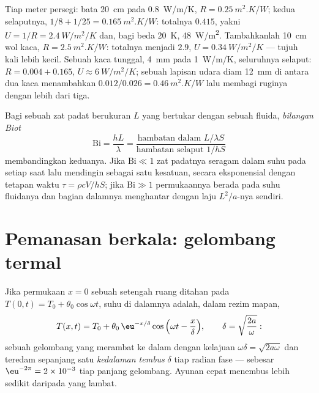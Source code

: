 \begin{example}\label{ex:b2:heat-conduction:wall}
Tiap meter persegi: bata \qty{20}{cm} pada \qty{0.8}{W/m/K}, $R =
\qty{0.25}{m^2.K/W}$; kedua selaputnya, $1/8 + 1/25 = \qty{0.165}{m^2.K/W}$:
totalnya $0.415$, yakni $U = 1/R = \qty{2.4}{W/m^2/K}$ dan, bagi beda \qty{20}{K},
\qty{48}{W/m^2}. Tambahkanlah \qty{10}{cm} wol kaca, $R =
\qty{2.5}{m^2.K/W}$: totalnya menjadi $2.9$, $U = \qty{0.34}{W/m^2/K}$ ---
tujuh kali lebih kecil. Sebuah kaca tunggal, \qty{4}{mm} pada \qty{1}{W/m/K},
seluruhnya selaput: $R = 0.004 + 0.165$, $U \approx \qty{6}{W/m^2/K}$; sebuah
lapisan udara diam \qty{12}{mm} di antara dua kaca menambahkan $0.012/0.026 =
\qty{0.46}{m^2.K/W}$ lalu membagi ruginya dengan lebih dari tiga.
\end{example}

\begin{definition}\label{def:b2:heat-conduction:biot}
Bagi sebuah zat padat berukuran $L$ yang bertukar dengan sebuah fluida, \emph{bilangan
Biot}
\[
\mathrm{Bi} = \frac{hL}{\lambda} = \frac{\text{hambatan dalam } L/\lambda S}{\text{hambatan selaput } 1/hS}
\]
membandingkan keduanya. Jika $\mathrm{Bi} \ll 1$ zat padatnya seragam dalam
suhu pada setiap saat lalu mendingin sebagai satu kesatuan, secara eksponensial dengan
tetapan waktu $\tau = \rho c V/hS$; jika $\mathrm{Bi} \gg 1$
permukaannya berada pada suhu fluidanya dan bagian dalamnya menghantar dengan
laju $L^2/a$-nya sendiri.
\end{definition}

\section{Pemanasan berkala: gelombang termal}

\begin{proposition}\label{prop:b2:heat-conduction:wave}
Jika permukaan $x = 0$ sebuah setengah ruang ditahan pada $T(0,t) = T_0 +
\theta_0\cos\omega t$, suhu di dalamnya adalah, dalam rezim
mapan,
\[
T(x,t) = T_0 + \theta_0\,\eu^{-x/\delta}\cos\Big(\omega t - \frac{x}{\delta}\Big),
\qquad \delta = \sqrt{\frac{2a}{\omega}} :
\]
sebuah gelombang yang merambat ke dalam dengan kelajuan $\omega\delta =
\sqrt{2a\omega}$ dan teredam sepanjang satu \emph{kedalaman tembus} $\delta$
tiap radian fase --- sebesar $\eu^{-2\pi} = 2 \times 10^{-3}$ tiap
panjang gelombang. Ayunan cepat menembus lebih sedikit daripada yang lambat.
\end{proposition}

